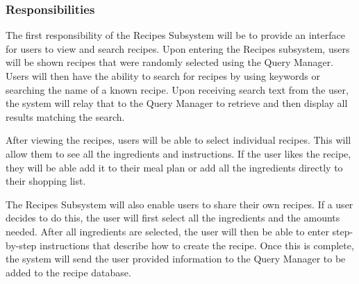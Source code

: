 \subsubsection{Responsibilities}
The first responsibility of the Recipes Subsystem will be to provide an interface for users to view and search recipes. Upon entering the Recipes subsystem, users will be shown recipes that were randomly selected using the Query Manager. Users will then have the ability to search for recipes by using keywords or searching the name of a known recipe. Upon receiving search text from the user, the system will relay that to the Query Manager to retrieve and then display all results matching the search. 

After viewing the recipes, users will be able to select individual recipes. This will allow them to see all the ingredients and instructions. If the user likes the recipe, they will be able add it to their meal plan or add all the ingredients directly to their shopping list.

The Recipes Subsystem will also enable users to share their own recipes. If a user decides to do this, the user will first select all the ingredients and the amounts needed. After all ingredients are selected, the user will then be able to enter step-by-step instructions that describe how to create the recipe. Once this is complete, the system will send the user provided information to the Query Manager to be added to the recipe database.

